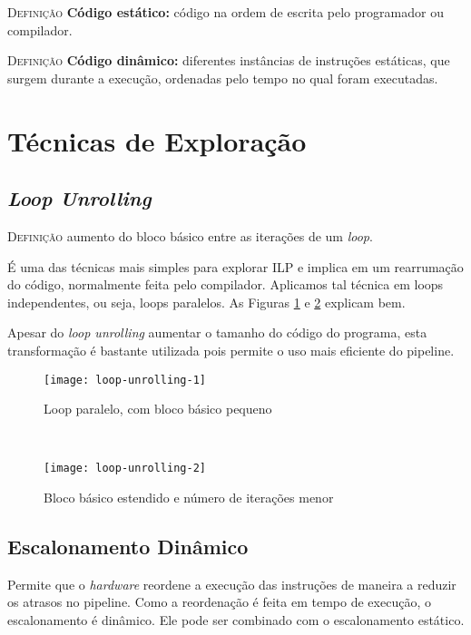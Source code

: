 \textsc{Definição} \textbf{Código estático:} código na ordem de escrita pelo programador ou compilador.

\textsc{Definição} \textbf{Código dinâmico:} diferentes instâncias de instruções estáticas, que surgem durante a execução, ordenadas pelo tempo no qual foram executadas.







\section{Técnicas de Exploração}

\subsection{\textit{Loop Unrolling}}
\textsc{Definição} aumento do bloco básico entre as iterações de um \textit{loop}.

É uma das técnicas mais simples para explorar ILP e implica em um rearrumação do código, normalmente feita pelo compilador. Aplicamos tal técnica em loops independentes, ou seja, loops paralelos. As Figuras \ref{fig:loop-unrolling-1} e \ref{fig:loop-unrolling-2} explicam bem.

Apesar do \textit{loop unrolling} aumentar o tamanho do código do programa, esta transformação é bastante utilizada pois permite o uso mais eficiente do pipeline.

\begin{figure*}
  \begin{subfigure}[b]{.45\textwidth}
    \centering
    \texttt{[image: loop-unrolling-1]}
    \caption{Loop paralelo, com bloco básico pequeno}
    \label{fig:loop-unrolling-1}
  \end{subfigure}
  ~
  \begin{subfigure}[b]{.45\textwidth}
    \centering
    \texttt{[image: loop-unrolling-2]}
    \caption{Bloco básico estendido e número de iterações menor}
    \label{fig:loop-unrolling-2}
  \end{subfigure}

  \caption{Exemplo de \textit{loop unrolling}}
\end{figure*}


\subsection{Escalonamento Dinâmico}
Permite que o \textit{hardware} reordene a execução das instruções de maneira a reduzir os atrasos no pipeline. Como a reordenação é feita em tempo de execução, o escalonamento é dinâmico. Ele pode ser combinado com o escalonamento estático.

